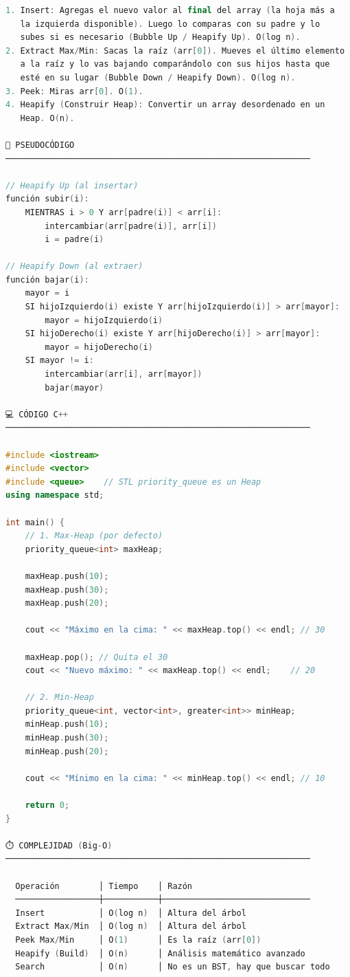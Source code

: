 \documentclass{article}
\begin{document}
\begin{lstlisting}[language=C++]
1. Insert: Agregas el nuevo valor al final del array (la hoja más a
   la izquierda disponible). Luego lo comparas con su padre y lo
   subes si es necesario (Bubble Up / Heapify Up). O(log n).
2. Extract Max/Min: Sacas la raíz (arr[0]). Mueves el último elemento
   a la raíz y lo vas bajando comparándolo con sus hijos hasta que
   esté en su lugar (Bubble Down / Heapify Down). O(log n).
3. Peek: Miras arr[0]. O(1).
4. Heapify (Construir Heap): Convertir un array desordenado en un
   Heap. O(n).

📝 PSEUDOCÓDIGO
──────────────────────────────────────────────────────────────

// Heapify Up (al insertar)
función subir(i):
    MIENTRAS i > 0 Y arr[padre(i)] < arr[i]:
        intercambiar(arr[padre(i)], arr[i])
        i = padre(i)

// Heapify Down (al extraer)
función bajar(i):
    mayor = i
    SI hijoIzquierdo(i) existe Y arr[hijoIzquierdo(i)] > arr[mayor]:
        mayor = hijoIzquierdo(i)
    SI hijoDerecho(i) existe Y arr[hijoDerecho(i)] > arr[mayor]:
        mayor = hijoDerecho(i)
    SI mayor != i:
        intercambiar(arr[i], arr[mayor])
        bajar(mayor)

💻 CÓDIGO C++
──────────────────────────────────────────────────────────────

#include <iostream>
#include <vector>
#include <queue>    // STL priority_queue es un Heap
using namespace std;

int main() {
    // 1. Max-Heap (por defecto)
    priority_queue<int> maxHeap;
    
    maxHeap.push(10);
    maxHeap.push(30);
    maxHeap.push(20);

    cout << "Máximo en la cima: " << maxHeap.top() << endl; // 30

    maxHeap.pop(); // Quita el 30
    cout << "Nuevo máximo: " << maxHeap.top() << endl;    // 20

    // 2. Min-Heap
    priority_queue<int, vector<int>, greater<int>> minHeap;
    minHeap.push(10);
    minHeap.push(30);
    minHeap.push(20);

    cout << "Mínimo en la cima: " << minHeap.top() << endl; // 10

    return 0;
}

⏱️ COMPLEJIDAD (Big-O)
──────────────────────────────────────────────────────────────

  Operación        │ Tiempo    │ Razón
  ─────────────────┼───────────┼──────────────────────────────
  Insert           │ O(log n)  │ Altura del árbol
  Extract Max/Min  │ O(log n)  │ Altura del árbol
  Peek Max/Min     │ O(1)      │ Es la raíz (arr[0])
  Heapify (Build)  │ O(n)      │ Análisis matemático avanzado
  Search           │ O(n)      │ No es un BST, hay que buscar todo
\end{lstlisting}
\end{document}
